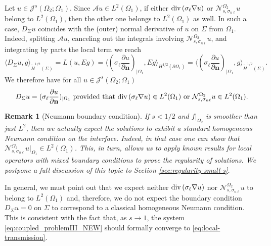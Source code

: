 \documentclass{amsart}
\newcommand{\Ol}{\Omega_{1}}%
\newcommand{\Onl}{\Omega_{2}}%
\renewcommand{\sl}{{\sigma_\ell}}
\newcommand{\snl}{{\sigma_{n\ell}}}
\def\calA{\mathcal{A}}
\def\vn{{\mathbf n}}
\newcommand{\Nsnl}{\mathcal{N}_{s,\snl}}
\renewcommand{\div}{{\rm div}\,}
\theoremstyle{plain}
\newtheorem{remark}{Remark}
\numberwithin{equation}{section}
\numberwithin{table}{section}
\numberwithin{figure}{section}
\numberwithin{theorem}{section}
\numberwithin{corollary}{section}
\numberwithin{definition}{section}
\numberwithin{lemma}{section}
\numberwithin{proposition}{section}
\numberwithin{remark}{section}
\begin{document}
Let $u \in \mathcal{J}^s(\Onl;\Ol)$. Since $\calA u \in L^2(\Ol)$, if either $\div (\sl \nabla u)$ or  $\Nsnl^{\Onl} u$ belong to $L^2(\Ol)$, then the other one belongs to $L^2(\Ol)$ as well. In such a case,  $D_\Sigma u$ coincides with the (outer) normal derivative of $u$ on $\Sigma$ from $\Ol$. Indeed, splitting $\calA u$, canceling out the integrals involving $\Nsnl^{\Onl} u$, and integrating by parts the local term we reach
\[
\langle D_\Sigma u , g \rangle_{ \widetilde{H}^{1/2}(\Sigma)} = L(u,Eg) =  \langle (\sl \frac{\partial u}{\partial \vn})_{|\Ol}, E g \rangle_{H^{1/2}(\partial\Ol)} =  \langle (\sl \frac{\partial u}{\partial \vn})_{|\Ol}, g \rangle_{ \widetilde{H}^{1/2}(\Sigma)}.
\]
We therefore have for all $u \in \mathcal{J}^s(\Onl;\Ol)$
\begin{equation} \label{eq:normal-derivative}
D_\Sigma u = (\sl \frac{\partial u}{\partial \vn})_{|\Ol}\mbox{ provided that } 
\div (\sl \nabla u)\in L^2(\Ol) \mbox{ or } \Nsnl^{\Onl} u\in L^2(\Ol).
\end{equation} 

\begin{remark}[Neumann boundary condition] 
\label{rem:homogeneous-Neumann}
If $s< 1/2$ and $f|_{\Onl}$ is smoother than just $L^2$, then we actually expect the solutions to exhibit a standard homogeneous Neumann condition on the interface. 
Indeed, in that case one can show that $ \Nsnl^{\Onl} u |_{\Ol} \in L^2(\Ol)$.  
This, in turn, allows us to apply known results for local operators with mixed boundary conditions to prove the regularity of solutions.
We postpone a full discussion of this topic to Section \ref{sec:regularity-small-s}.
\end{remark}

In general, we must point out that we expect neither $\div (\sl \nabla u)$ nor $\Nsnl^{\Onl} u$ to belong to $L^2(\Ol)$ and, therefore, we do not expect the boundary condition $D_\Sigma u = 0$ on $\Sigma$ to correspond to a classical homogeneous Neumann condition.
%
This is consistent with the fact that, as $s \to 1$, the system \eqref{eq:coupled_problemIII_NEW} should formally converge to \eqref{eq:local-transmission}.


\end{document}
